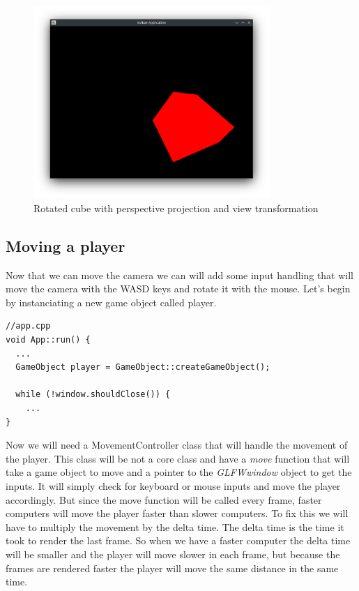 \documentclass[12pt]{report} \usepackage{preamble}
\begin{document}
\begin{figure}[htbp]
	\centering
	\includegraphics[width=0.8\textwidth]{images/view_transformation.png}
	\caption{Rotated cube with perspective projection and view transformation}
\end{figure} \FloatBarrier

\subsection{Moving a player}

Now that we can move the camera we can will add some input handling that will move the camera with the WASD keys and rotate it with the mouse.
Let's begin by instanciating a new game object called player.

\begin{lstlisting}[Language=C++]
//app.cpp
void App::run() {
  ...
  GameObject player = GameObject::createGameObject();

  while (!window.shouldClose()) {
    ...
}
\end{lstlisting}

Now we will need a MovementController class that will handle the movement of the player. This class will be not a core class and have a \textit{move} function that will take a game object to move and
a pointer to the \textit{GLFWwindow} object to get the inputs. It will simply check for keyboard or mouse inputs and move the player accordingly. But since the move function will be called
every frame, faster computers will move the player faster than slower computers. To fix this we will have to multiply the movement by the delta time. The delta time is the time it took to render the last frame.
So when we have a faster computer the delta time will be smaller and the player will move slower in each frame, but because the frames are rendered faster the player will move the same distance in the same time.
\end{document}
